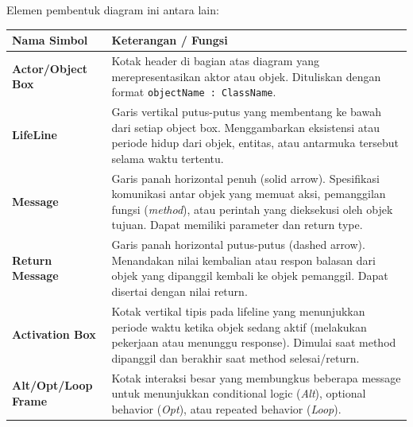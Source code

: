 \documentclass[12pt,a4paper]{article}
\begin{document}
Elemen pembentuk diagram ini antara lain:

\begin{table}[h]
\centering
\begin{tabular}{@{}p{3.5cm}p{10cm}@{}}
\toprule
\textbf{Nama Simbol} & \textbf{Keterangan / Fungsi} \\ \midrule
\textbf{Actor/Object Box} & Kotak header di bagian atas diagram yang merepresentasikan aktor atau objek. Dituliskan dengan format \texttt{objectName : ClassName}. \\ \addlinespace
\textbf{LifeLine} & Garis vertikal putus-putus yang membentang ke bawah dari setiap object box. Menggambarkan eksistensi atau periode hidup dari objek, entitas, atau antarmuka tersebut selama waktu tertentu. \\ \addlinespace
\textbf{Message} & Garis panah horizontal penuh (solid arrow). Spesifikasi komunikasi antar objek yang memuat aksi, pemanggilan fungsi (\textit{method}), atau perintah yang dieksekusi oleh objek tujuan. Dapat memiliki parameter dan return type. \\ \addlinespace
\textbf{Return Message} & Garis panah horizontal putus-putus (dashed arrow). Menandakan nilai kembalian atau respon balasan dari objek yang dipanggil kembali ke objek pemanggil. Dapat disertai dengan nilai return. \\ \addlinespace
\textbf{Activation Box} & Kotak vertikal tipis pada lifeline yang menunjukkan periode waktu ketika objek sedang aktif (melakukan pekerjaan atau menunggu response). Dimulai saat method dipanggil dan berakhir saat method selesai/return. \\ \addlinespace
\textbf{Alt/Opt/Loop Frame} & Kotak interaksi besar yang membungkus beberapa message untuk menunjukkan conditional logic (\textit{Alt}), optional behavior (\textit{Opt}), atau repeated behavior (\textit{Loop}). \\ \bottomrule
\end{tabular}
\end{table}
\end{document}

